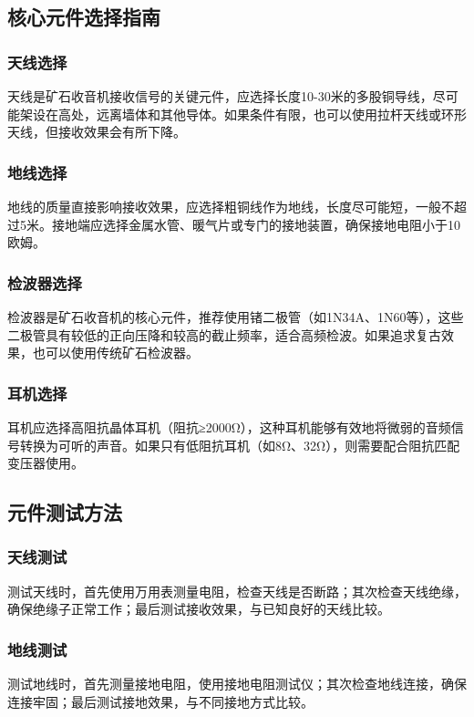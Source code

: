 \documentclass[12pt,UTF8]{ctexbook}
\begin{document}
\subsection{核心元件选择指南}

\subsubsection{天线选择}
天线是矿石收音机接收信号的关键元件，应选择长度10-30米的多股铜导线，尽可能架设在高处，远离墙体和其他导体。如果条件有限，也可以使用拉杆天线或环形天线，但接收效果会有所下降。

\subsubsection{地线选择}
地线的质量直接影响接收效果，应选择粗铜线作为地线，长度尽可能短，一般不超过5米。接地端应选择金属水管、暖气片或专门的接地装置，确保接地电阻小于10欧姆。

\subsubsection{检波器选择}
检波器是矿石收音机的核心元件，推荐使用锗二极管（如1N34A、1N60等），这些二极管具有较低的正向压降和较高的截止频率，适合高频检波。如果追求复古效果，也可以使用传统矿石检波器。

\subsubsection{耳机选择}
耳机应选择高阻抗晶体耳机（阻抗≥2000Ω），这种耳机能够有效地将微弱的音频信号转换为可听的声音。如果只有低阻抗耳机（如8Ω、32Ω），则需要配合阻抗匹配变压器使用。

\subsection{元件测试方法}

\subsubsection{天线测试}
测试天线时，首先使用万用表测量电阻，检查天线是否断路；其次检查天线绝缘，确保绝缘子正常工作；最后测试接收效果，与已知良好的天线比较。

\subsubsection{地线测试}
测试地线时，首先测量接地电阻，使用接地电阻测试仪；其次检查地线连接，确保连接牢固；最后测试接地效果，与不同接地方式比较。
\end{document}
